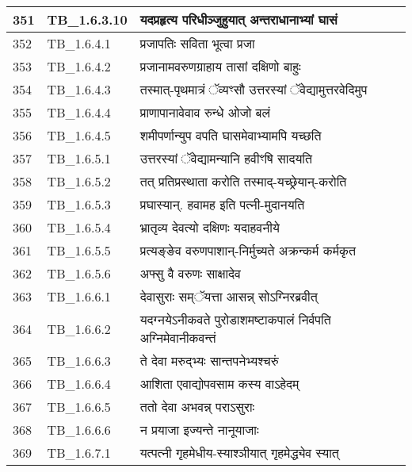 \documentclass[17pt]{extarticle}
\begin{document}
\begin{longtable}{||p{0.4in}||p{0.9in}||p{4.0in}||p{0.9in}||}
        \hline
            351 & TB\_1.6.3.10 & यदप्रहृत्य परिधीञ्जुहुयात् अन्तराधानाभ्यां घासं &      \\
        \hline
            352 & TB\_1.6.4.1 & प्रजापतिः सविता भूत्वा प्रजा &      \\
        \hline
            353 & TB\_1.6.4.2 & प्रजानामवरुणग्राहाय तासां दक्षिणो बाहुः &      \\
        \hline
            354 & TB\_1.6.4.3 & तस्मात्{-}पृथमात्रं ॅव्यꣳसौ उत्तरस्यां ॅवेद्यामुत्तरवेदिमुप &      \\
        \hline
            355 & TB\_1.6.4.4 & प्राणापानावेवाव रुन्धे ओजो बलं &      \\
        \hline
            356 & TB\_1.6.4.5 & शमीपर्णान्युप वपति घासमेवाभ्यामपि यच्छति &      \\
        \hline
            357 & TB\_1.6.5.1 & उत्तरस्यां ॅवेद्यामन्यानि हवीꣳषि सादयति &      \\
        \hline
            358 & TB\_1.6.5.2 & तत् प्रतिप्रस्थाता करोति तस्माद्{-}यच्छ्रेयान्{-}करोति &      \\
        \hline
            359 & TB\_1.6.5.3 & प्रघास्यान्. हवामह इति पत्नी{-}मुदानयति &      \\
        \hline
            360 & TB\_1.6.5.4 & भ्रातृव्य देवत्यो दक्षिणः यदाहवनीये &      \\
        \hline
            361 & TB\_1.6.5.5 & प्रत्यङ्ङेव वरुणपाशान्{-}निर्मुच्यते अक्रन्कर्म कर्मकृत &      \\
        \hline
            362 & TB\_1.6.5.6 & अफ्सु वै वरुणः साक्षादेव &      \\
        \hline
            363 & TB\_1.6.6.1 & देवासुराः सम्ॅयत्ता आसन्न् सोऽग्निरब्रवीत् &      \\
        \hline
            364 & TB\_1.6.6.2 & यदग्नयेऽनीकवते पुरोडाशमष्टाकपालं निर्वपति अग्निमेवानीकवन्तं &      \\
        \hline
            365 & TB\_1.6.6.3 & ते देवा मरुद्भ्यः सान्तपनेभ्यश्चरुं &      \\
        \hline
            366 & TB\_1.6.6.4 & आशिता एवाद्योपवसाम कस्य वाऽहेदम् &      \\
        \hline
            367 & TB\_1.6.6.5 & ततो देवा अभवन्न् पराऽसुराः &      \\
        \hline
            368 & TB\_1.6.6.6 & न प्रयाजा इज्यन्ते नानूयाजाः &      \\
        \hline
            369 & TB\_1.6.7.1 & यत्पत्नी गृहमेधीय{-}स्याश्ञीयात् गृहमेद्ध्येव स्यात् &      \\

\end{longtable}
\end{document}
